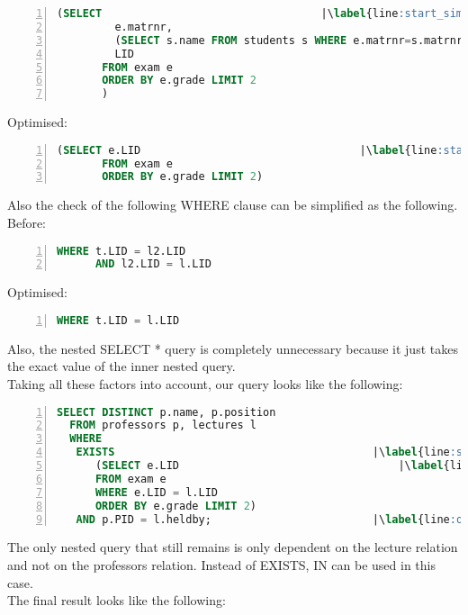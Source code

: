 \begin{enumerate}
\begin{lstlisting}[language=sql,numbers=left, stepnumber=1, numberstyle = \tiny,escapechar=|]
      (SELECT                                  |\label{line:start_simplify}|
         e.matrnr,
         (SELECT s.name FROM students s WHERE e.matrnr=s.matrnr),
         LID
       FROM exam e
       ORDER BY e.grade LIMIT 2
       )
\end{lstlisting}

Optimised:

\begin{lstlisting}[language=sql,numbers=left, stepnumber=1, numberstyle = \tiny,escapechar=|]
      (SELECT e.LID                                  |\label{line:start_simplify}|
       FROM exam e
       ORDER BY e.grade LIMIT 2)
\end{lstlisting}

Also the check of the following WHERE clause can be simplified as the following.\\
Before:

\begin{lstlisting}[language=sql,numbers=left, stepnumber=1, numberstyle = \tiny,escapechar=|]
  WHERE t.LID = l2.LID
      AND l2.LID = l.LID
\end{lstlisting}

Optimised:

\begin{lstlisting}[language=sql,numbers=left, stepnumber=1, numberstyle = \tiny,escapechar=|]
  WHERE t.LID = l.LID
\end{lstlisting}

Also, the nested SELECT * query is completely unnecessary because it just takes the exact value of the inner nested query.\\
Taking all these factors into account, our query looks like the following:

\begin{lstlisting}[language=sql,numbers=left, stepnumber=1, numberstyle = \tiny,escapechar=|]
  SELECT DISTINCT p.name, p.position
  FROM professors p, lectures l
  WHERE 
   EXISTS                                        |\label{line:start_exist}|
      (SELECT e.LID                                  |\label{line:start_simplify}|
      FROM exam e
      WHERE e.LID = l.LID
      ORDER BY e.grade LIMIT 2)                                          
   AND p.PID = l.heldby;                         |\label{line:outer_p_o_joinpred}| 
\end{lstlisting}

\newpage
The only nested query that still remains is only dependent on the lecture relation and not on the professors relation. Instead of EXISTS, IN can be used in this case.\\
The final result looks like the following:


\end{enumerate}

